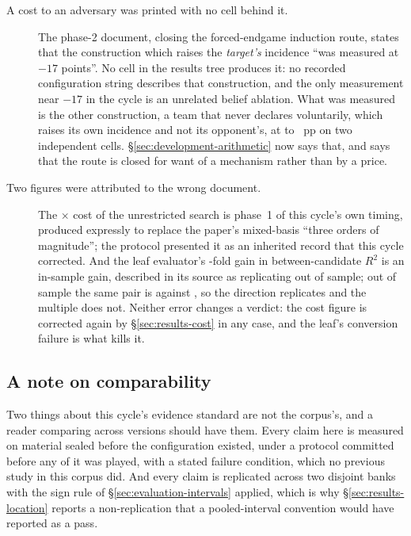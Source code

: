 \begin{description}
\item[A cost to an adversary was printed with no cell behind it.] The phase-2 document, closing the
  forced-endgame induction route, states that the construction which raises the \emph{target's}
  incidence ``was measured at $-17$ points''. No cell in the results tree produces it: no recorded
  configuration string describes that construction, and the only measurement near $-17$ in the cycle
  is an unrelated belief ablation. What was measured is the other construction, a team that never
  declares voluntarily, which raises its own incidence and not its opponent's, at
  \vsevenLthirteenAdvCostLo{} to \vsevenLthirteenAdvCostHi{}~pp on two independent cells.
  \S\ref{sec:development-arithmetic} now says that, and says that the route is closed for want of a
  mechanism rather than by a price.

\item[Two figures were attributed to the wrong document.] The
  \vsevenPhaseOneCost$\times$ cost of the unrestricted search is phase~1 of this cycle's own timing,
  produced expressly to replace the \vsix{} paper's mixed-basis ``three orders of magnitude''; the
  protocol presented it as an inherited record that this cycle corrected. And the leaf evaluator's \vsevenKoneFold-fold gain in between-candidate
  $R^2$ is an in-sample gain, described in its source as replicating out of sample; out of sample the
  same pair is \vsevenKoneRsqOosBefore{} against \vsevenKoneRsqOosAfter{}, so the direction
  replicates and the multiple does not. Neither error changes a verdict: the cost figure is corrected
  again by \S\ref{sec:results-cost} in any case, and the leaf's conversion failure is what kills it.

\end{description}

\subsection{A note on comparability}
\label{app:corrections-comparability}

Two things about this cycle's evidence standard are not the corpus's, and a reader comparing across
versions should have them. Every claim here is measured on material sealed before the configuration
existed, under a protocol committed before any of it was played, with a stated failure condition, which no previous study in this corpus did. And every claim is replicated across two disjoint banks
with the sign rule of \S\ref{sec:evaluation-intervals} applied, which is why
\S\ref{sec:results-location} reports a non-replication that a pooled-interval convention would have
reported as a pass.
